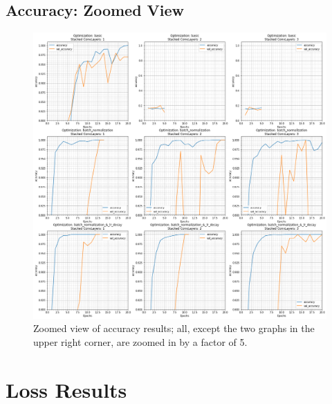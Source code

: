 \documentclass{article}
\begin{document}
\newpage

\subsection{Accuracy: Zoomed View}
\begin{figure}[h]
    \centering
    \centerline{
        \includegraphics[width=0.65\paperwidth]{accuracy_zoomed}
    }
    \caption{Zoomed view of accuracy results; all, except the two graphs in the upper right corner, are zoomed in by a factor of 5.}
    \label{fig:accuracy_zoomed}
\end{figure}

\newpage

\section{Loss Results}
\label{app:loss}
\end{document}
